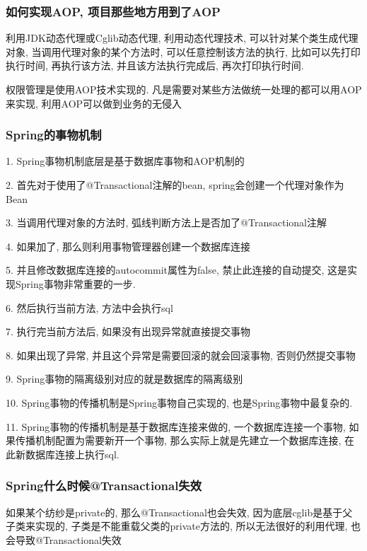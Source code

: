 \documentclass[UTF8]{ctexart}
\begin{document}
\subsubsection{如何实现AOP, 项目那些地方用到了AOP}
利用JDK动态代理或Cglib动态代理, 利用动态代理技术, 可以针对某个类生成代理对象, 当调用代理对象的某个方法时, 可以任意控制该方法的执行, 比如可以先打印执行时间, 再执行该方法, 并且该方法执行完成后, 再次打印执行时间. \par
权限管理是使用AOP技术实现的. 凡是需要对某些方法做统一处理的都可以用AOP来实现, 利用AOP可以做到业务的无侵入 \par
\subsubsection{Spring的事物机制}
1. Spring事物机制底层是基于数据库事物和AOP机制的 \par
2. 首先对于使用了@Transactional注解的bean, spring会创建一个代理对象作为Bean \par
3. 当调用代理对象的方法时, 弧线判断方法上是否加了@Transactional注解 \par
4. 如果加了, 那么则利用事物管理器创建一个数据库连接 \par
5. 并且修改数据库连接的autocommit属性为false, 禁止此连接的自动提交, 这是实现Spring事物非常重要的一步. \par
6. 然后执行当前方法, 方法中会执行sql \par
7. 执行完当前方法后, 如果没有出现异常就直接提交事物 \par
8. 如果出现了异常, 并且这个异常是需要回滚的就会回滚事物, 否则仍然提交事物 \par
9. Spring事物的隔离级别对应的就是数据库的隔离级别 \par
10. Spring事物的传播机制是Spring事物自己实现的, 也是Spring事物中最复杂的. \par
11. Spring事物的传播机制是基于数据库连接来做的, 一个数据库连接一个事物, 如果传播机制配置为需要新开一个事物, 那么实际上就是先建立一个数据库连接, 在此新数据库连接上执行sql.
\subsubsection{Spring什么时候@Transactional失效}
如果某个纺纱是private的, 那么@Transactional也会失效, 因为底层cglib是基于父子类来实现的, 子类是不能重载父类的private方法的, 所以无法很好的利用代理, 也会导致@Transactional失效 \par
\end{document}
